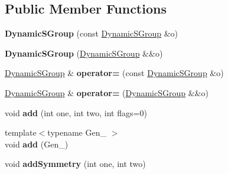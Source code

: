 \subsection*{Public Member Functions}
\begin{DoxyCompactItemize}
\item 
\mbox{\label{class_eigen_1_1_dynamic_s_group_a5f1f473d1f482b43e3b25b560dfc75c7}} 
{\bfseries Dynamic\+S\+Group} (const \hyperlink{class_eigen_1_1_dynamic_s_group}{Dynamic\+S\+Group} \&o)
\item 
\mbox{\label{class_eigen_1_1_dynamic_s_group_aa9bc1a645dabd45f2771bff3f53e438e}} 
{\bfseries Dynamic\+S\+Group} (\hyperlink{class_eigen_1_1_dynamic_s_group}{Dynamic\+S\+Group} \&\&o)
\item 
\mbox{\label{class_eigen_1_1_dynamic_s_group_a1e713d6200cfaa2bfa72d08c18cb0b3a}} 
\hyperlink{class_eigen_1_1_dynamic_s_group}{Dynamic\+S\+Group} \& {\bfseries operator=} (const \hyperlink{class_eigen_1_1_dynamic_s_group}{Dynamic\+S\+Group} \&o)
\item 
\mbox{\label{class_eigen_1_1_dynamic_s_group_a8661b8489f8027f096700433b1890eac}} 
\hyperlink{class_eigen_1_1_dynamic_s_group}{Dynamic\+S\+Group} \& {\bfseries operator=} (\hyperlink{class_eigen_1_1_dynamic_s_group}{Dynamic\+S\+Group} \&\&o)
\item 
\mbox{\label{class_eigen_1_1_dynamic_s_group_ab6d3580987345d4ef81c139e8399147b}} 
void {\bfseries add} (int one, int two, int flags=0)
\item 
\mbox{\label{class_eigen_1_1_dynamic_s_group_a1bdc8d772a461f809baef36a0ad1e21a}} 
{\footnotesize template$<$typename Gen\+\_\+ $>$ }\\void {\bfseries add} (Gen\+\_\+)
\item 
\mbox{\label{class_eigen_1_1_dynamic_s_group_a2efbaedb2063d418df9e3056b7616b20}} 
void {\bfseries add\+Symmetry} (int one, int two)
\item 
\mbox{\label{class_eigen_1_1_dynamic_s_group_ac8415c3653c3c1e7053f8f930f2b9e24}} 

\end{DoxyCompactItemize}
